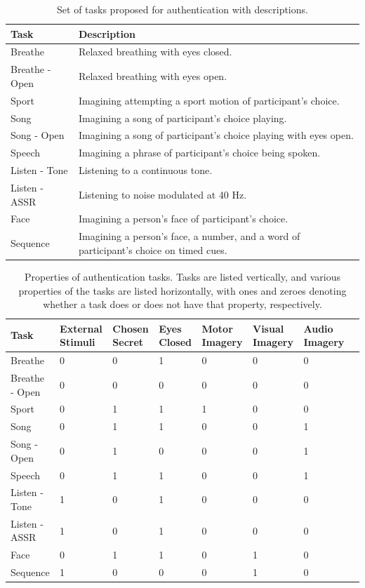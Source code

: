 \documentclass[11pt]{article}
\begin{document}
\begin{table}[h]
\caption{Set of tasks proposed for authentication with descriptions.}
\centering
\begin{tabular}{p{2.7cm}p{11cm}}
\hline
\textbf{Task} & \textbf{Description} \\
\hline
Breathe & Relaxed breathing with eyes closed.\\
Breathe - Open & Relaxed breathing with eyes open.\\
Sport & Imagining attempting a sport motion of participant's choice. \\
Song & Imagining a song of participant's choice playing. \\
Song - Open & Imagining a song of participant's choice playing with eyes open. \\
Speech & Imagining a phrase of participant's choice being spoken.\\
Listen - Tone & Listening to a continuous tone.\\
Listen - ASSR & Listening to noise modulated at 40 Hz.\\
Face & Imagining a person's face of participant's choice.\\
Sequence & Imagining a person's face, a number, and a word of participant's choice on timed cues.\\
\hline
\end{tabular}
\end{table}

\begin{table}[h]
\caption{Properties of authentication tasks. Tasks are listed vertically, and various properties of the tasks are listed horizontally,
with ones and zeroes denoting whether a task does or does not have that property, respectively.}
\begin{tabular}{p{2.7cm}p{1.7cm}p{1.7cm}p{1.7cm}p{1.7cm}p{1.7cm}p{1.7cm}p{1.7cm}}
\hline
\textbf{Task} & \textbf{External Stimuli} & \textbf{Chosen Secret} & \textbf{Eyes Closed} & \textbf{Motor Imagery} & \textbf{Visual Imagery} & \textbf{Audio Imagery} \\
\hline
Breathe & 0 & 0 & 1 & 0 & 0 & 0\\
Breathe - Open & 0 & 0 & 0 & 0 & 0 & 0\\
Sport & 0 & 1 & 1 & 1 & 0 & 0\\
Song & 0 & 1 & 1 & 0 & 0 & 1\\
Song - Open & 0 & 1 & 0 & 0 & 0 & 1\\
Speech & 0 & 1 & 1 & 0 & 0 & 1\\
Listen - Tone & 1 & 0 & 1 & 0 & 0 & 0\\
Listen - ASSR & 1 & 0 & 1 & 0 & 0 & 0\\
Face & 0 & 1 & 1 & 0 & 1 & 0\\
Sequence & 1 & 0 & 0 & 0 & 1 & 0\\
\hline
\end{tabular}
\end{table}
\end{document}
